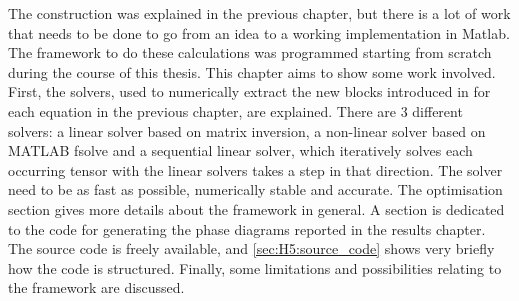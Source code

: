 The construction was explained in the previous chapter, but there is a lot of work that needs to be done to go from an idea to a working implementation in Matlab. The framework to do these calculations was programmed starting from scratch during the course of this thesis. This chapter aims to show some work involved.
First, the solvers, used to numerically extract the new blocks introduced in for each equation in the previous chapter, are explained. There are 3 different solvers: a linear solver based on matrix inversion, a non-linear solver based on MATLAB fsolve and a sequential linear solver, which iteratively solves each occurring tensor with the linear solvers takes a step in that direction. The solver need to be as fast as possible, numerically stable and accurate.
The optimisation section gives more details about the framework in general. A section is dedicated to the code for generating the phase diagrams reported in the results chapter.  The source code is freely available, and \cref{sec:H5:source_code} shows very briefly how the code is structured. Finally, some limitations and possibilities relating to the framework are discussed.